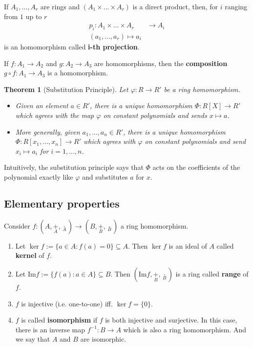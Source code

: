 \documentclass[12pt,a4paper]{article}
\newtheorem{theorem}{Theorem}[section]
\theoremstyle{definition}
\begin{document}
If $A_1, \ldots, A_r$ are rings and $(A_1 \times \ldots \times A_r)$ is a direct product, then, for $i$ ranging from $1$ up to $r$
\begin{equation*}
\begin{aligned}
p_i : A_1 \times \ldots \times A_r & \to A_i \\
(a_1, \ldots, a_r) \mapsto a_i
\end{aligned}
\end{equation*}
is an homomorphism called \textbf{i-th projection}.

If $f:A_1 \to A_2$ and $g:A_2 \to A_3$ are homomorphisms, then the \textbf{composition} $g \circ f : A_1 \to A_3$ is a homomorphism.

\begin{theorem}[Substitution Principle]
Let $\varphi : R \to R'$ be a ring homomorphism. 
\begin{itemize}
\item Given an element $a \in R'$, there is a unique homomorphism $\Phi : R[X] \to R'$ which agrees with the map $\varphi$ on constant polynomials and sends $x \mapsto a$.
\item More generally, given $a_1, \ldots, a_n \in R'$, there is a unique homomorphism $\Phi : R[x_1,\ldots,x_n] \to R'$ which agrees with $\varphi$ on constant polynomials and send $x_i \mapsto a_i$ for $i=1,\ldots,n$.
\end{itemize}
\end{theorem}

Intuitively, the substitution principle says that $\Phi$ acts on the coefficients of the polynomial exactly like $\varphi$ and substitutes $a$ for $x$.

\subsection{Elementary properties}

Consider $f: (A, \underset{A}{+}, \underset{A}{\cdot}) \to (B, \underset{B}{+}, \underset{B}{\cdot})$ a ring homomorphism. 
\begin{enumerate}
\item Let $\ker f := \{ a \in A : f(a) = 0 \} \subseteq A$. Then $\ker f$ is an ideal of $A$ called \textbf{kernel} of $f$.
\item Let $\text{Im} f := \{ f(a) : a \in A \} \subseteq B$. Then $(\text{Im} f, \underset{B}{+}, \underset{B}{\cdot})$ is a ring called \textbf{range} of $f$.
\item $f$ is injective (i.e. one-to-one) iff. $\ker f = \{ 0 \}$.
\item $f$ is called \textbf{isomorphism} if $f$ is both injective and surjective. In this case, there is an inverse map $f^{-1} : B \to A$ which is also a ring homomorphism. And we say that $A$ and $B$ are isomorphic.
\end{enumerate}
\end{document}
